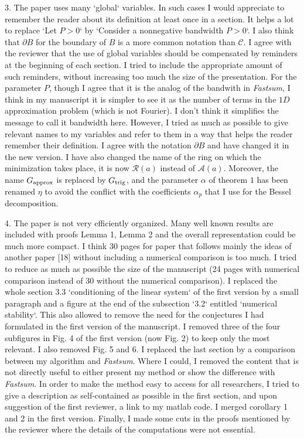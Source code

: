 \documentclass[10pt]{article}
\begin{document}
	\begin{response}{3. The paper uses many `global` variables. In such cases I would appreciate to
	remember the reader about its definition at least once in a section. It helps a
	lot to replace `Let $P > 0$` by `Consider a nonnegative bandwidth $P > 0$`. I
	also think that $\partial B$ for the boundary of $B$ is a more common notation than $\mathcal{C}$.}
	I agree with the reviewer that the use of global variables should be compensated by reminders at the beginning of each section. I tried to include the appropriate amount of such reminders, without increasing too much the size of the presentation. 
	For the parameter $P$, though I agree that it is the analog of the bandwith in \textit{Fastsum}, I think in my manuscript it is simpler to see it as the number of terms in the $1D$ approximation problem (which is not Fourier). I don't think it simplifies the message to call it bandwidth here. However, I tried as much as possible to give relevant names to my variables and refer to them in a way that helps the reader remember their definition. I agree with the notation $\partial B$ and have changed it in the new version. I have also changed the name of the ring on which the minimization takes place, it is now $\mathcal{R}(a)$ instead of $\mathcal{A}(a)$. Moreover, the name $G_{\textup{approx}}$ is replaced by $G_{\textup{trig}}$, and the parameter $\alpha$ of theorem $1$ has been renamed $\eta$ to avoid the conflict with the coefficients $\alpha_p$ that I use for the Bessel decomposition. 
\end{response}
\begin{response}{4. The paper is not very efficiently organized. Many well known results are included with proofs Lemma 1, Lemma 2 and the overall representation could be much more compact. I think 30 pages for paper that follows mainly the
ideas of another paper [18] without including a numerical comparison is too	much.}
I tried to reduce as much as possible the size of the manuscript (24 pages with numerical comparison instead of 30 without the numerical comparison). I replaced the whole section 3.3 `conditioning of the linear system` of the first version by a small paragraph and a figure at the end of the subsection `3.2` entitled `numerical stability`. This also allowed to remove the need for the conjectures I had formulated in the first version of the manuscript. I removed three of the four subfigures in Fig. 4 of the first version (now Fig. 2) to keep only the most relevant. I also removed Fig. 5 and 6. I replaced the last section by a comparison between my algorithm and \textit{Fastsum}. Where I could, I removed the content that is not directly useful to either present my method or show the difference with \textit{Fastsum}. In order to make the method easy to access for all researchers, I tried to give a description as self-contained as possible in the first section, and upon suggestion of the first reviewer, a link to my matlab code. I merged corollary 1 and 2 in the first version. Finally, I made some cuts in the proofs mentioned by the reviewer where the details of the computations were not essential.
\end{response}
\end{document}

